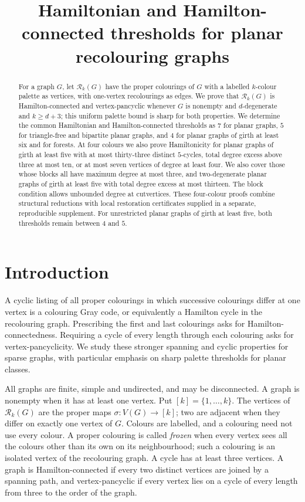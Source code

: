 \documentclass[11pt]{article}
\title{Hamiltonian and Hamilton-connected thresholds for planar recolouring graphs}
\author{}
\date{}
\theoremstyle{remark}
\newcommand{\Rk}{\mathcal R_k}
\numberwithin{equation}{section}
\numberwithin{table}{section}
\begin{document}
\maketitle

\begin{abstract}
For a graph $G$, let $\Rk(G)$ have the proper colourings of $G$ with a
labelled $k$-colour palette as vertices, with one-vertex recolourings as
edges. We prove that $\Rk(G)$ is Hamilton-connected and vertex-pancyclic
whenever $G$ is nonempty and $d$-degenerate and $k\ge d+3$; this uniform
palette bound is sharp for both properties. We determine the common
Hamiltonian and Hamilton-connected thresholds as $7$ for planar graphs,
$5$ for triangle-free and bipartite planar graphs, and $4$ for planar
graphs of girth at least six and for forests. At four colours we also
prove Hamiltonicity for planar graphs of girth at least five with at
most thirty-three distinct $5$-cycles, total degree excess above three
at most ten, or at most seven vertices of degree at least four. We
also cover those whose blocks all have maximum degree at most three,
and two-degenerate planar graphs of girth at least five with total
degree excess at most thirteen.
The block condition allows unbounded degree at cutvertices.
These four-colour proofs combine structural
reductions with local restoration certificates supplied in a separate,
reproducible supplement. For unrestricted planar graphs of girth at
least five, both thresholds remain between $4$ and $5$.
\end{abstract}

\section{Introduction}

A cyclic listing of all proper colourings in which successive colourings
differ at one vertex is a colouring Gray code, or equivalently a Hamilton
cycle in the recolouring graph. Prescribing the first and last
colourings asks for Hamilton-connectedness. Requiring a cycle of every
length through each colouring asks for vertex-pancyclicity. We study
these stronger spanning and cyclic properties for sparse graphs, with
particular emphasis on sharp palette thresholds for planar classes.

All graphs are finite, simple and undirected, and may be disconnected.
A graph is nonempty when it has at least one vertex. Put $[k]=\{1,\ldots,k\}$.
The vertices of $\Rk(G)$ are the proper maps $\sigma:V(G)\to[k]$;
two are adjacent when they differ on exactly one vertex of $G$.
Colours are labelled, and a colouring need not use every colour.
A proper colouring is called \emph{frozen} when every vertex sees all
the colours other than its own on its neighbourhood; such a colouring
is an isolated vertex of the recolouring graph.
A cycle has at least three vertices. A graph is Hamilton-connected if
every two distinct vertices are joined by a spanning path, and
vertex-pancyclic if every vertex lies on a cycle of every length from
three to the order of the graph.
\end{document}
